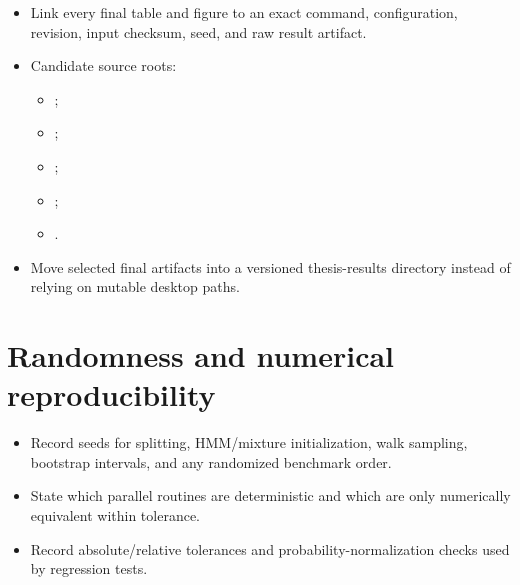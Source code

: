 \begin{itemize}
  \item Link every final table and figure to an exact command, configuration, revision, input checksum, seed, and raw result artifact.
  \item Candidate source roots:
  \begin{itemize}
    \item {};
    \item {};
    \item {};
    \item {};
    \item {}.
  \end{itemize}
  \item Move selected final artifacts into a versioned thesis-results directory instead of relying on mutable desktop paths.
\end{itemize}

\section{Randomness and numerical reproducibility}

\begin{itemize}
  \item Record seeds for splitting, HMM/mixture initialization, walk sampling, bootstrap intervals, and any randomized benchmark order.
  \item State which parallel routines are deterministic and which are only numerically equivalent within tolerance.
  \item Record absolute/relative tolerances and probability-normalization checks used by regression tests.
\end{itemize}
